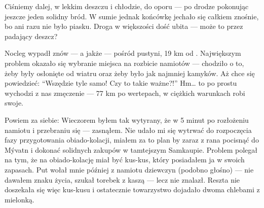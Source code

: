 Ciśniemy dalej, w lekkim deszczu i chłodzie, do oporu --- po drodze pokonując jeszcze jeden solidny bród. W sumie jednak końcówkę jechało się całkiem znośnie, bo ani razu nie było piasku. Droga w większości dość ubita --- może to przez padający deszcz?


Nocleg wypadł znów --- a jakże --- pośród pustyni, 19 km od . Największym problem okazało się wybranie miejsca na rozbicie namiotów --- chodziło o to, żeby były osłonięte od wiatru oraz żeby było jak najmniej kamyków. Aż chce się powiedzieć: “Wszędzie tyle samo! Czy to takie ważne?!” Hm… to po prostu wychodzi z nas zmęczenie --- 77 km po wertepach, w ciężkich warunkach robi swoje.

Powiem za siebie: Wieczorem byłem tak wytyrany, że w 5 minut po rozłożeniu namiotu i przebraniu się --- zasnąłem. Nie udało mi się wytrwać do rozpoczęcia fazy przygotowania obiado-kolacji, miałem za to plan by zaraz z rana pocisnąć do Mývatn i dokonać solidnych zakupów w tamtejszym Samkaupie. Problem polegał na tym, że na obiado-kolację miał być kus-kus, który posiadałem ja w swoich zapasach. Put wołał mnie później z namiotu dziewczyn (podobno głośno) --- nie dawałem znaku życia, szukał torebek z kaszą --- lecz nie znalazł. Reszta nie doszekała się więc kus-kusu i ostatecznie towarzystwo dojadało dwoma chlebami z mielonką.
